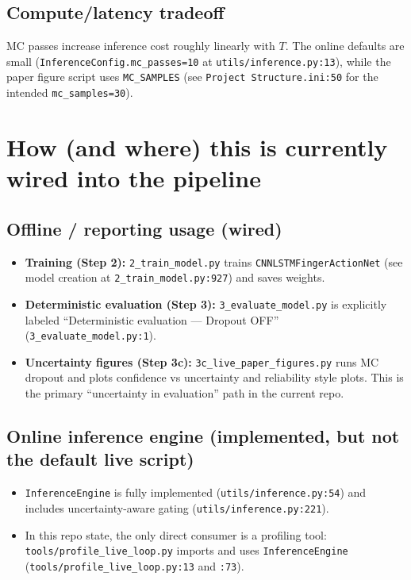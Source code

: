 \documentclass[11pt]{article}
\begin{document}
\subsection{Compute/latency tradeoff}
MC passes increase inference cost roughly linearly with $T$.
The online defaults are small (\texttt{InferenceConfig.mc\_passes=10} at \texttt{utils/inference.py:13}), while the paper figure script uses \texttt{MC\_SAMPLES} (see \texttt{Project Structure.ini:50} for the intended \texttt{mc\_samples=30}).

\section{How (and where) this is currently wired into the pipeline}

\subsection{Offline / reporting usage (wired)}
\begin{itemize}
  \item \textbf{Training (Step 2):} \texttt{2\_train\_model.py} trains \texttt{CNNLSTMFingerActionNet} (see model creation at \texttt{2\_train\_model.py:927}) and saves weights.
  \item \textbf{Deterministic evaluation (Step 3):} \texttt{3\_evaluate\_model.py} is explicitly labeled ``Deterministic evaluation --- Dropout OFF'' (\texttt{3\_evaluate\_model.py:1}).
  \item \textbf{Uncertainty figures (Step 3c):} \texttt{3c\_live\_paper\_figures.py} runs MC dropout and plots confidence vs uncertainty and reliability style plots. This is the primary ``uncertainty in evaluation'' path in the current repo.
\end{itemize}

\subsection{Online inference engine (implemented, but not the default live script)}
\begin{itemize}
  \item \texttt{InferenceEngine} is fully implemented (\texttt{utils/inference.py:54}) and includes uncertainty-aware gating (\texttt{utils/inference.py:221}).
  \item In this repo state, the only direct consumer is a profiling tool: \texttt{tools/profile\_live\_loop.py} imports and uses \texttt{InferenceEngine} (\texttt{tools/profile\_live\_loop.py:13} and \texttt{:73}).
\end{itemize}
\end{document}
